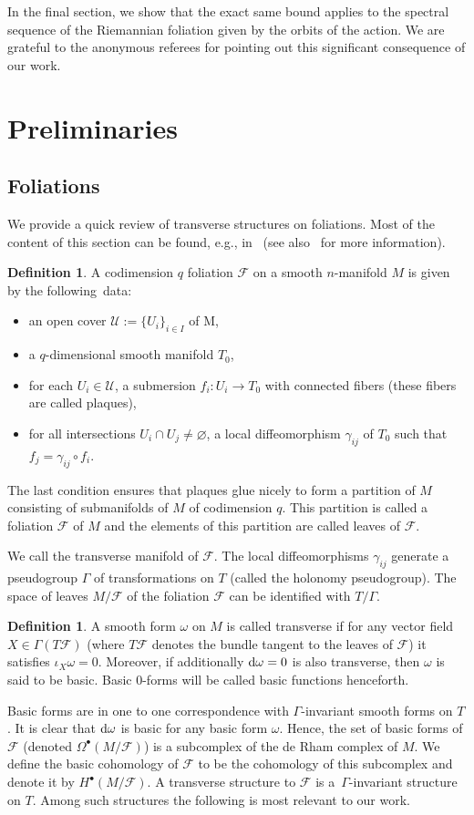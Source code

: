 \documentclass[pdftex]{sigma}
\numberwithin{equation}{section}
\theoremstyle{definition}
\newtheorem{defi}[tw]{Definition}
\begin{document}
In the final section, we show that the exact same bound applies to the spectral sequence of the Riemannian foliation given by the orbits of the action. We are grateful to the anonymous referees for pointing out this significant consequence of our work.
\section{Preliminaries}
\subsection{Foliations}
We provide a quick review of transverse structures on foliations. Most of the content of this section can be found, e.g., in~\cite{E1} (see also~\cite{M} for more information).
\begin{defi} A codimension $q$ foliation $\mathcal{F}$ on a smooth $n$-manifold $M$ is given by the following~data:
\begin{itemize}\itemsep=0pt
\item an open cover $\mathcal{U}:=\{U_i\}_{i\in I}$ of M,
\item a $q$-dimensional smooth manifold $T_0$,
\item for each $U_i\in\mathcal{U}$, a submersion $f_i\colon U_i\rightarrow T_0$ with connected fibers (these fibers are called plaques),
\item for all intersections $U_i\cap U_j\neq\varnothing$, a local diffeomorphism $\gamma_{ij}$ of $T_0$ such that $f_j=\gamma_{ij}\circ f_i$.
\end{itemize}
The last condition ensures that plaques glue nicely to form a partition of $M$ consisting of submanifolds of $M$ of codimension $q$. This partition is called a foliation $\mathcal{F}$ of $M$ and the elements of this partition are called leaves of $\mathcal{F}$.
\end{defi}
We call  the transverse manifold of $\mathcal{F}$. The local diffeomorphisms $\gamma_{ij}$ generate a pseudogroup $\Gamma$ of transformations on $T$ (called the holonomy pseudogroup). The space of leaves $M\slash\mathcal{F}$ of the foliation $\mathcal{F}$ can be identified with $T\slash\Gamma$.
\begin{defi}
 A smooth form $\omega$ on $M$ is called transverse if for any vector field $X\in\Gamma (T\mathcal{F})$ (where $T\mathcal{F}$ denotes the bundle tangent to the leaves of $\mathcal{F}$) it satisfies $\iota_X\omega=0$. Moreover, if additionally ${\rm d}\omega=0$ is also transverse, then $\omega$ is said to be basic. Basic $0$-forms will be called basic functions henceforth.
\end{defi}
Basic forms are in one to one correspondence with $\Gamma$-invariant smooth forms on $T$. It is clear that ${\rm d}\omega$ is basic for any basic form $\omega$. Hence, the set of basic forms of $\mathcal{F}$ (denoted $\Omega^{\bullet}(M\slash\mathcal{F})$) is a subcomplex of the de Rham complex of $M$. We define the basic cohomology of $\mathcal{F}$ to be the cohomology of this subcomplex and denote it by $H^{\bullet}(M\slash\mathcal{F})$. A transverse structure to $\mathcal{F}$ is a~$\Gamma$-invariant structure on $T$. Among such structures the following is most relevant to our work.
\end{document}
